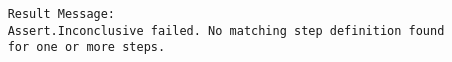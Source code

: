 \begin{verbatim}
    Result Message:	
    Assert.Inconclusive failed. No matching step definition found 
    for one or more steps.
\end{verbatim}